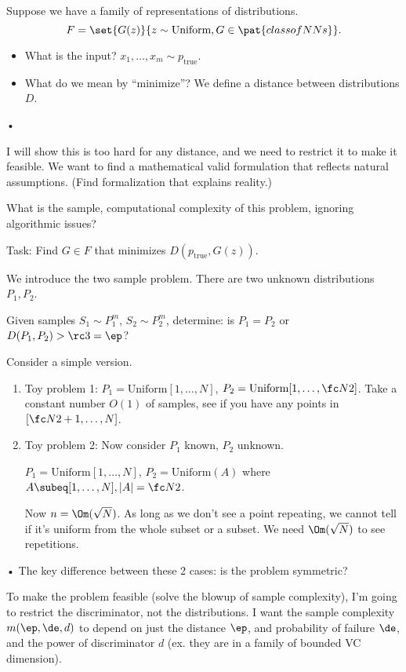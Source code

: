 Suppose we have a family of representations of distributions.
$$
F=\set{G(z)}{z\sim \text{Uniform}, G\in \pat{class of NNs}}.
$$
\begin{itemize}
\item
What is the input? $x_1,\ldots, x_m\sim p_{\text{true}}$.
\item
What do we mean by ``minimize''? We define a distance between distributions $D$.
\end{itemize}•

I will show this is too hard for any distance, and we need to restrict it to make it feasible. We want to find a mathematical valid formulation that reflects natural assumptions. (Find formalization that explains reality.) 

What is the sample, computational complexity of this problem, ignoring algorithmic issues?

Task: Find $G\in F$ that minimizes $D(p_{\text{true}}, G(z))$.

We introduce the two sample problem. There are two unknown distributions $P_1, P_2$. 

\begin{prb}
Given samples $S_1\sim P_1^m$, $S_2\sim P_2^m$, determine: is $P_1=P_2$ or $D(P_1,P_2)>\rc 3=\ep$?
\end{prb}


Consider a simple version. 
\begin{enumerate}
\item
Toy problem 1: 
$P_1=\text{Uniform}[1,\ldots, N]$, $P_2 = \text{Uniform}[1,\ldots, \fc N2]$. Take a constant number $O(1)$ of samples, see if you have any points in $[\fc N2+1,\ldots, N]$. 
\item
Toy problem 2:
Now consider $P_1$ known, $P_2$ unknown.

$P_1=\text{Uniform}[1,\ldots, N]$, $P_2 = \text{Uniform}(A)$ where $A\subeq [1,\ldots, N], |A|=\fc N2$. 

Now $n=\Om(\sqrt N)$. As long as we don't see a point repeating, we cannot tell if it's uniform from the whole subset or a subset. We need $\Om(\sqrt N)$ to see repetitions.
\end{enumerate}•
The key difference between these 2 cases: is the problem symmetric?

%
To make the problem feasible (solve the blowup of sample complexity), I'm going to restrict the discriminator, not the distributions.
I want the sample complexity $m(\ep,\de,d)$ to depend on just the distance $\ep$, and probability of failure $\de$, and the power of discriminator $d$ (ex. they are in a family of bounded VC dimension).

